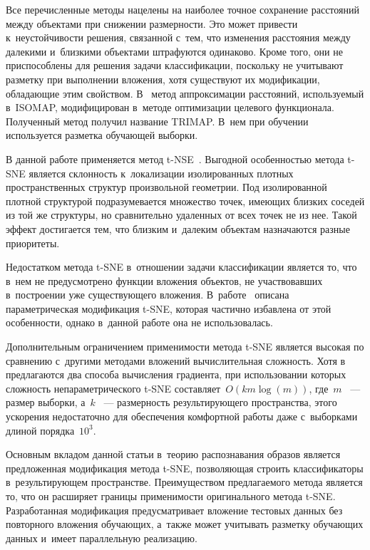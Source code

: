 \begin{multicols}{2}
Все перечисленные методы нацелены на наиболее точное сохранение расстояний между 
объектами при снижении размерности. Это может при\-вес\-ти к~неустойчивости решения, 
связанной с~тем, что изменения расстояния между далекими и~близкими объектами 
штрафуются одинаково. Кроме того, они не приспособлены для решения задачи 
классификации, поскольку не учитывают разметку при выполнении вложения, хотя 
существуют их модификации, обладающие этим свойством. В~\cite{chen2010distance} 
метод аппроксимации расстояний, используемый в~ISOMAP, модифицирован в~методе 
оптимизации целевого функционала. Полученный метод получил название TRIMAP. 
В~нем при обучении используется разметка обучающей выборки.

В данной работе применяется метод t-NSE~\cite{maaten2008visualizing}. Выгодной особенностью метода t-SNE 
является склонность к~локализации изолированных плотных пространственных структур 
произвольной геометрии. Под изолированной плотной структурой подразумевается 
множество точек, имеющих близких соседей из той же структуры, но сравнительно 
удаленных от всех точек не из нее. Такой эффект достигается тем, что близким 
и~далеким объектам назначаются разные приоритеты.

Недостатком метода t-SNE в~отношении задачи классификации является то, что в~нем 
не преду\-смот\-ре\-но функции вложения объектов, не участвовавших в~построении уже 
существующего вложения. В~работе~\cite{van2009learning} описана параметрическая 
модификация t-SNE, которая частично избавлена от этой особенности, однако в~данной 
работе она не использовалась.

Дополнительным ограничением применимости метода t-SNE является высокая по 
сравнению с~другими методами вложений вычислительная сложность. 
Хотя в~\cite{van2014accelerating} предлагаются два способа вычисления градиента, 
при использовании которых сложность непараметрического t-SNE 
со\-став\-ля\-ет~$O(k  m \log(m))$, где~$m$ ~--- размер выборки, а~$k$ ~--- 
размерность результирующего пространства, этого ускорения недостаточно для 
обеспечения комфортной работы даже с~выборками длиной порядка~$10^3$.

Основным вкладом данной статьи в~теорию распознавания образов является предложенная 
модификация метода t-SNE, позволяющая строить классификаторы в~результирующем 
пространстве. Преиму\-ществом предлагаемого метода является то, что он расширяет 
границы применимости оригинального метода t-SNE. Разработанная модификация 
предусматривает вложение тестовых данных без повторного вложения обучающих, 
а~также может учитывать разметку обучающих данных и~имеет параллельную реализацию.


\end{multicols}
